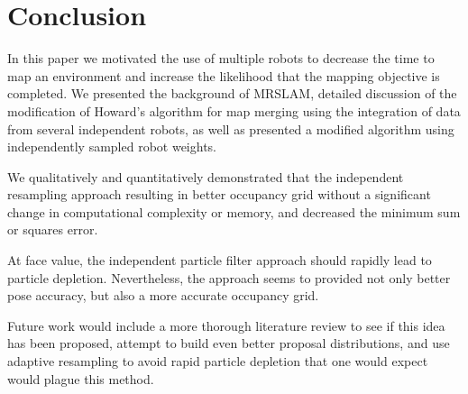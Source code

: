 \section{Conclusion}
\label{S:Conc}


In this paper we motivated the use of multiple robots to decrease the time to map an environment and increase the likelihood that the mapping objective is completed.  We presented the background of MRSLAM, detailed discussion of the modification of Howard's algorithm \cite{howard2006multi} for map merging using the integration of data from several independent robots, as well as presented a modified algorithm using independently sampled robot weights.

We qualitatively and quantitatively demonstrated that the independent resampling approach resulting in better occupancy grid without a significant change in computational complexity or memory, and decreased the minimum sum or squares error.  

At face value, the independent particle filter approach should rapidly lead to particle depletion.  Nevertheless, the approach seems to provided not only better pose accuracy, but also a more accurate occupancy grid.

Future work would include a more thorough literature review to see if this idea has been proposed, attempt to build even better proposal distributions, and use adaptive resampling to avoid rapid particle depletion \cite{Grisetti2007} that one would expect would plague this method.